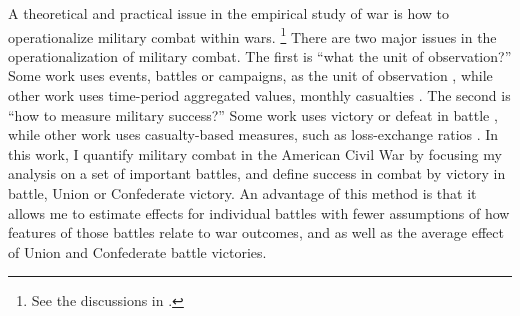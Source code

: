 A theoretical and practical issue in the empirical study of war is how to operationalize military combat within wars.%
\footnote{
  See the discussions in \textcites{ReiterStam1998}{BiddleLong2004}{Reiter2003}{GrauerHorowitz2012}{Weisiger2015}.
}
There are two major issues in the operationalization of military combat.
The first is ``what the unit of observation?''
Some work uses events, \eg{}battles or campaigns, as the unit of observation \parencites{ReiterStam1998}{ReiterStam2002}{Ramsay2008}[59-60]{Reiter2009}{PilsterBoehmelt2011a}{GrauerHorowitz2012}, while other work uses time-period aggregated values, \eg{}monthly casualties \textcite{Weisiger2015}.
The second is ``how to measure military success?''
Some work uses victory or defeat in battle \parencites{ReiterStam1998}{ReiterStam2002}{GrauerHorowitz2012}, while other work uses casualty-based measures, such as loss-exchange ratios  \parencites{Biddle2004}{BiddleLong2004}{PilsterBoehmelt2011a}.
In this work, I quantify military combat in the American Civil War by focusing my analysis on a set of important battles, and define success in combat by victory in battle, \ie{}Union or Confederate victory.
An advantage of this method is that it allows me to estimate effects for individual battles with fewer assumptions of how features of those battles relate to war outcomes, and as well as the average effect of Union and Confederate battle victories.

